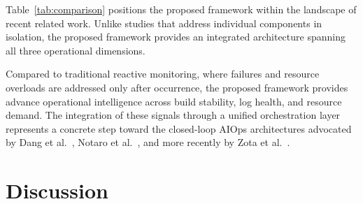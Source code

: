 \documentclass[sn-nature]{sn-jnl}
\theoremstyle{thmstyleone}
\theoremstyle{thmstyletwo}
\theoremstyle{thmstylethree}
\begin{document}
Table~\ref{tab:comparison} positions the proposed framework within the landscape of recent related work.
Unlike studies that address individual components in isolation, the proposed framework provides an integrated architecture spanning all three operational dimensions.

\begin{table}[htbp]
\centering
\caption{Comparison with related work}\label{tab:comparison}
\end{table}

Compared to traditional reactive monitoring, where failures and resource overloads are addressed only after occurrence, the proposed framework provides advance operational intelligence across build stability, log health, and resource demand.
The integration of these signals through a unified orchestration layer represents a concrete step toward the closed-loop AIOps architectures advocated by Dang et al.~\cite{dang2019aiops}, Notaro et al.~\cite{notaro2021aiops}, and more recently by Zota et al.~\cite{zota2025agentic}.

\section{Discussion}\label{sec:discussion}
\end{document}
